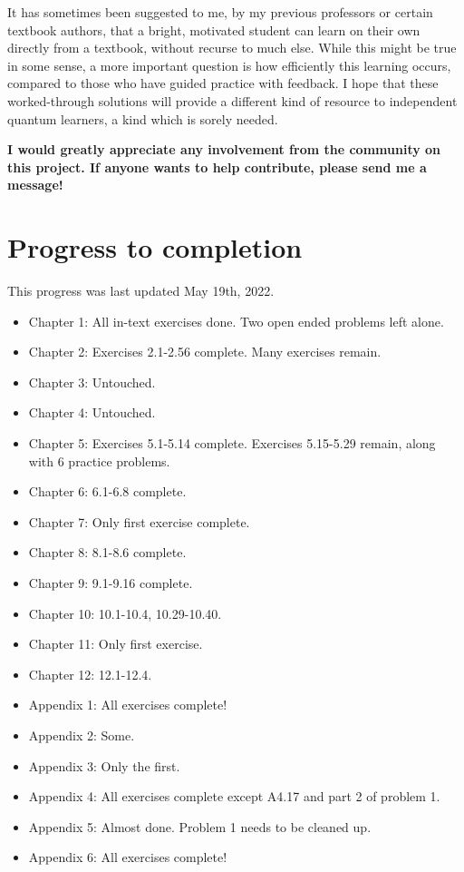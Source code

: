 \documentclass{book}
\begin{document}
It has sometimes been suggested to me, by my previous professors or certain textbook authors, that a bright, motivated student can learn on their own directly from a textbook, without recurse to much else. While this might be true in some sense, a more important question is how efficiently this learning occurs, compared to those who have guided practice with feedback. I hope that these worked-through solutions will provide a different kind of resource to independent quantum learners, a kind which is sorely needed.

\textbf{I would greatly appreciate any involvement from the community on this project. If anyone wants to help contribute, please send me a message!}

\section{Progress to completion}

This progress was last updated May 19th, 2022.

\begin{itemize}
    \item Chapter 1: All in-text exercises done. Two open ended problems left alone.
    \item Chapter 2: Exercises 2.1-2.56 complete. Many exercises remain.
    \item Chapter 3: Untouched.
    \item Chapter 4: Untouched.
    \item Chapter 5: Exercises 5.1-5.14 complete. Exercises 5.15-5.29 remain, along with 6 practice problems.
    \item Chapter 6: 6.1-6.8 complete.
    \item Chapter 7: Only first exercise complete.
    \item Chapter 8: 8.1-8.6 complete.
    \item Chapter 9: 9.1-9.16 complete.
    \item Chapter 10: 10.1-10.4, 10.29-10.40.
    \item Chapter 11: Only first exercise.
    \item Chapter 12: 12.1-12.4.
    \item Appendix 1: All exercises complete!
    \item Appendix 2: Some.
    \item Appendix 3: Only the first.
    \item Appendix 4: All exercises complete except A4.17 and part 2 of problem 1.
    \item Appendix 5: Almost done. Problem 1 needs to be cleaned up. 
    \item Appendix 6: All exercises complete!
\end{itemize}
\end{document}
